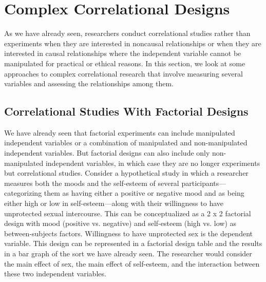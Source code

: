 \newpage   
\section{Complex Correlational Designs}


As we have already seen, researchers conduct correlational studies rather than experiments when they are interested in noncausal relationships or when they are interested in causal relationships where the independent variable cannot be manipulated for practical or ethical reasons. In this section, we look at some approaches to complex correlational research that involve measuring several variables and assessing the relationships among them.

\subsection{Correlational Studies With Factorial Designs}

We have already seen that factorial experiments can include manipulated independent variables or a combination of manipulated and non-manipulated independent variables. But factorial designs can also include only non- manipulated independent variables, in which case they are no longer experiments but correlational studies. Consider a hypothetical study in which a researcher measures both the moods and the self-esteem of several participants---categorizing them as having either a positive or negative mood and as being either high or low in self-esteem---along with their willingness to have unprotected sexual intercourse. This can be conceptualized as a 2 x 2 factorial design with mood (positive vs. negative) and self-esteem (high vs. low) as between-subjects factors. Willingness to have unprotected sex is the dependent variable. This design can be represented in a factorial design table and the results in a bar graph of the sort we have already seen. The researcher would consider the main effect of sex, the main effect of self-esteem, and the interaction between these two independent variables.

